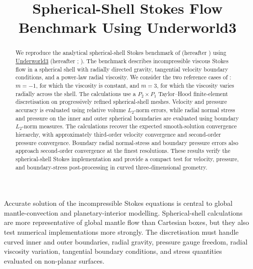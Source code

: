 \documentclass[gmd, manuscript]{copernicus}
\begin{document}
\title{Spherical-Shell Stokes Flow Benchmark Using Underworld3}




\received{}
\pubdiscuss{}
\revised{}
\accepted{}
\published{}


\maketitle

\begin{abstract}
We reproduce the analytical spherical-shell Stokes benchmark of
\citet{thieulot2017} (hereafter ) using
\href{https://github.com/underworldcode/underworld3}{Underworld3}
(hereafter ; \citealp{Moresi2025}). The benchmark
describes incompressible viscous Stokes flow in a spherical shell with
radially directed gravity, tangential velocity boundary conditions, and a
power-law radial viscosity. We consider the two reference cases of
: \(m=-1\), for which the viscosity is constant, and
\(m=3\), for which the viscosity varies radially across the shell. The
 calculations use a \(P_2\times P_1\) Taylor--Hood
finite-element discretisation on progressively refined spherical-shell meshes.
Velocity and pressure accuracy is evaluated using relative volume
\(L_2\)-norm errors, while radial normal stress and pressure on the inner and
outer spherical boundaries are evaluated using boundary \(L_2\)-norm measures.
The calculations recover the expected smooth-solution convergence hierarchy,
with approximately third-order velocity convergence and second-order pressure
convergence. Boundary radial normal-stress and boundary pressure errors also
approach second-order convergence at the finest resolutions. These results
verify the  spherical-shell Stokes implementation and
provide a compact test for velocity, pressure, and boundary-stress
post-processing in curved three-dimensional geometry.
\end{abstract}

\introduction

Accurate solution of the incompressible Stokes equations is central to global
mantle-convection and planetary-interior modelling. Spherical-shell
calculations are more representative of global mantle flow than Cartesian
boxes, but they also test numerical implementations more strongly. The
discretisation must handle curved inner and outer boundaries, radial gravity,
pressure gauge freedom, radial viscosity variation, tangential boundary
conditions, and stress quantities evaluated on non-planar surfaces.
\end{document}
